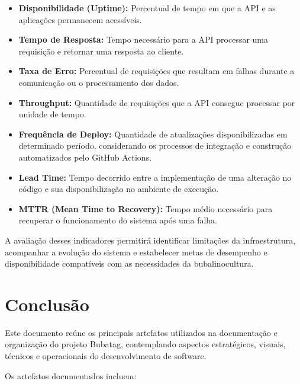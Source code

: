 \documentclass[11pt,a4paper]{article}
\begin{document}
\begin{itemize}
    \item \textbf{Disponibilidade (Uptime):} Percentual de tempo em que a API e as aplicações permanecem acessíveis.

    \item \textbf{Tempo de Resposta:} Tempo necessário para a API processar uma requisição e retornar uma resposta ao cliente.

    \item \textbf{Taxa de Erro:} Percentual de requisições que resultam em falhas durante a comunicação ou o processamento dos dados.

    \item \textbf{Throughput:} Quantidade de requisições que a API consegue processar por unidade de tempo.

    \item \textbf{Frequência de Deploy:} Quantidade de atualizações disponibilizadas em determinado período, considerando os processos de integração e construção automatizados pelo GitHub Actions.

    \item \textbf{Lead Time:} Tempo decorrido entre a implementação de uma alteração no código e sua disponibilização no ambiente de execução.

    \item \textbf{MTTR (Mean Time to Recovery):} Tempo médio necessário para recuperar o funcionamento do sistema após uma falha.
\end{itemize}

A avaliação desses indicadores permitirá identificar limitações da infraestrutura, acompanhar a evolução do sistema e estabelecer metas de desempenho e disponibilidade compatíveis com as necessidades da bubalinocultura.

\newpage
\section{Conclusão}

Este documento reúne os principais artefatos utilizados na documentação e organização do projeto Bubatag, contemplando aspectos estratégicos, visuais, técnicos e operacionais do desenvolvimento de software.

Os artefatos documentados incluem:
\end{document}
